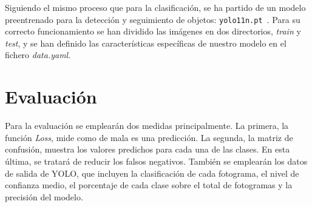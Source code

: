 \documentclass[12pt]{report} %
\begin{document}
    Siguiendo el mismo proceso que para la clasificación, se ha partido de un modelo preentrenado para la detección y seguimiento de objetos: \texttt{yolo11n.pt}~\cite{YOLODetect}. Para su correcto funcionamiento se han dividido las imágenes en dos directorios, \textit{train} y \textit{test}, y se han definido las características específicas de nuestro modelo en el fichero \textit{data.yaml}. 

    

    \section{Evaluación}

    Para la evaluación se emplearán dos medidas principalmente. La primera,
    la función \textit{Loss}, mide como de mala es una predicción. La
    segunda, la matriz de confusión, muestra los valores predichos para cada
    una de las clases. En esta última, se tratará de reducir los falsos
    negativos. También se emplearán los datos de salida de YOLO, que incluyen
    la clasificación de cada fotograma, el nivel de confianza medio, el
    porcentaje de cada clase sobre el total de fotogramas y la precisión del
    modelo.
\end{document}
